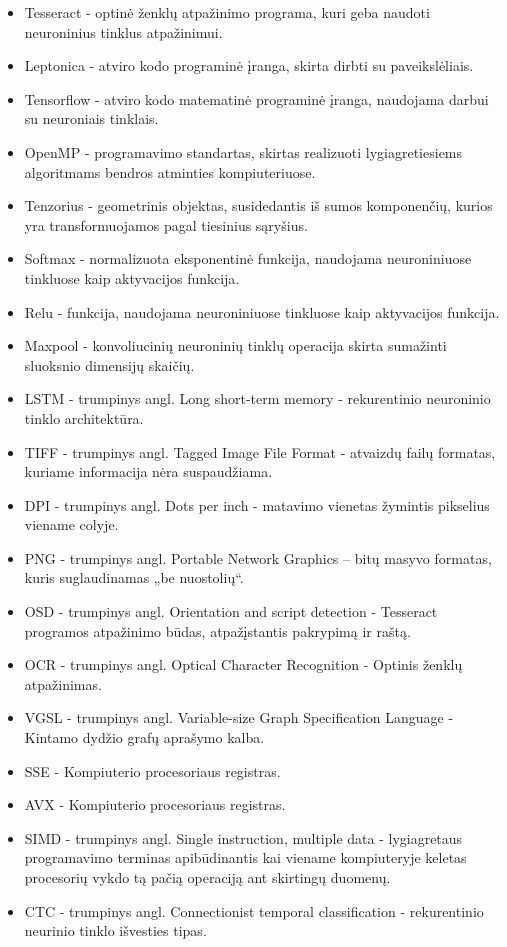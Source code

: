 \documentclass{VUMIFInfBakalaurinis}
\begin{document}
\pagebreak
{}
\begin{itemize}
  \item Tesseract - optinė ženklų atpažinimo programa, kuri geba naudoti neuroninius tinklus atpažinimui.
  \item Leptonica - atviro kodo programinė įranga, skirta dirbti su paveikslėliais.
  \item Tensorflow - atviro kodo matematinė programinė įranga, naudojama darbui su neuroniais tinklais.
  \item OpenMP - programavimo standartas, skirtas realizuoti lygiagretiesiems algoritmams bendros atminties kompiuteriuose.
  \item Tenzorius - geometrinis objektas, susidedantis iš sumos komponenčių, kurios yra transformuojamos pagal tiesinius sąryšius.
  \item Softmax - normalizuota eksponentinė funkcija, naudojama neuroniniuose tinkluose kaip aktyvacijos funkcija.
  \item Relu - funkcija, naudojama neuroniniuose tinkluose kaip aktyvacijos funkcija.
  \item Maxpool - konvoliucinių neuroninių tinklų operacija skirta sumažinti sluoksnio dimensijų skaičių.
\end{itemize}

\begin{itemize}
  \item LSTM - trumpinys angl. Long short-term memory - rekurentinio neuroninio tinklo architektūra.
  \item TIFF - trumpinys angl. Tagged Image File Format - atvaizdų failų formatas, kuriame informacija nėra suspaudžiama.
  \item DPI - trumpinys angl. Dots per inch - matavimo vienetas žymintis pikselius viename colyje.
  \item PNG - trumpinys angl. Portable Network Graphics – bitų masyvo formatas, kuris suglaudinamas „be nuostolių“. 
  \item OSD - trumpinys angl. Orientation and script detection - Tesseract programos atpažinimo būdas, atpažįstantis pakrypimą ir raštą.
  \item OCR - trumpinys angl.  Optical Character Recognition - Optinis ženklų atpažinimas.
  \item VGSL - trumpinys angl. Variable-size Graph Specification Language - Kintamo dydžio grafų aprašymo kalba.
  \item SSE - Kompiuterio procesoriaus registras.
  \item AVX - Kompiuterio procesoriaus registras.
  \item SIMD - trumpinys angl. Single instruction, multiple data - lygiagretaus programavimo terminas apibūdinantis kai viename kompiuteryje keletas procesorių vykdo tą pačią operaciją ant skirtingų duomenų.
  \item CTC - trumpinys angl. Connectionist temporal classification - rekurentinio neurinio tinklo išvesties tipas.
\end{itemize}
\end{document}
